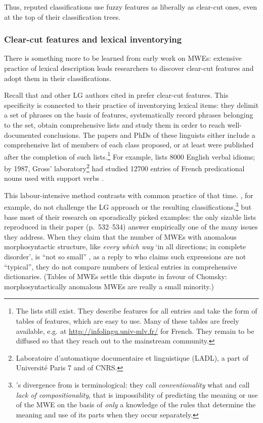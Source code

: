 \documentclass[output=paper]{langsci/langscibook}
\begin{document}
Thus, reputed classifications use fuzzy features as liberally as clear-cut ones, even at the top of their classification trees.

\subsubsection{Clear-cut features and lexical inventorying}
\label{clearcutfeatures}

There is something more to be learned from early work on MWEs: extensive practice of lexical description leads researchers to discover clear-cut features and adopt them in their classifications. 

Recall that \citet{Labelle1974} and other LG authors cited in  prefer clear-cut features. This specificity is connected to their practice of inventorying lexical items: they delimit a set of phrases on the basis of features, systematically record phrases belonging to the set, obtain comprehensive lists and study them in order to reach well-documented conclusions. The papers and PhDs of these linguists either include a comprehensive list of members of each class proposed, or at least were published after the completion of such lists.\footnote{The lists still exist. They describe features for all entries and take the form of tables of features, which are easy to use. Many of these tables are freely available, e.g. at \url{http://infolingu.univ-mlv.fr/} for French. They remain to be diffused so that they reach out to the mainstream community.} For example, \citet{Freckleton1985} lists 8000 English verbal idioms; by 1987, Gross’ laboratory\footnote{Laboratoire d’automatique documentaire et linguistique (LADL), a part of Université Paris 7 and of CNRS.} had studied 12700 entries of French predicational nouns used with support verbs \citep[144]{Tolone2011}. 

This labour-intensive method contrasts with common practice of that time. \cite[498]{Nunberg1994}, for example, do not challenge the LG approach or the resulting classifications,\footnote{\label{footnote-laporte-13}
\citet[498]{Nunberg1994}’s  divergence from \citet{Machonis1985} is terminological: they call \textit{conventionality} what \citet[306]{Machonis1985} and \cite[128]{Danlos1988}  call  \textit{lack of compositionality}, that is impossibility of predicting the meaning or use of the MWE on the basis of \textit{only} a knowledge of the rules that determine the meaning and use of its parts when they occur separately.} but base most of their research on sporadically picked examples: the only sizable lists reproduced in their paper (p.~532--534) answer empirically one of the many issues they address. When they claim that the number of MWEs with anomalous morphosyntactic structure, like \textit{every which way} ‘in all directions; in complete disorder’, is “not so small” \citep[515]{Nunberg1994}, as a reply to \citet[149]{Chomsky1980} who claims such expressions are not “typical”, they do not compare numbers of lexical entries in comprehensive dictionaries. (Tables of MWEs settle this dispute in favour of Chomsky: morphosyntactically anomalous MWEs are really a small minority.) %
\end{document}
